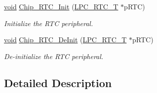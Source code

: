\begin{DoxyCompactItemize}
\hyperlink{Paradigm_2Tern__EE_2small_2portmacro_8h_a14d32f8130d3c0b212cfc751730b5b49}{void} \hyperlink{group__RTC__17XX__40XX_gac37fe41fed088f1336797e05674125ff}{Chip\-\_\-\-R\-T\-C\-\_\-\-Init} (\hyperlink{structLPC__RTC__T}{L\-P\-C\-\_\-\-R\-T\-C\-\_\-\-T} $\ast$p\-R\-T\-C)
\begin{DoxyCompactList}\small\item\em Initialize the R\-T\-C peripheral. \end{DoxyCompactList}\item 
\hyperlink{Paradigm_2Tern__EE_2small_2portmacro_8h_a14d32f8130d3c0b212cfc751730b5b49}{void} \hyperlink{group__RTC__17XX__40XX_ga63cc16f1c4b72523e0e67a6c651f0026}{Chip\-\_\-\-R\-T\-C\-\_\-\-De\-Init} (\hyperlink{structLPC__RTC__T}{L\-P\-C\-\_\-\-R\-T\-C\-\_\-\-T} $\ast$p\-R\-T\-C)
\begin{DoxyCompactList}\small\item\em De-\/initialize the R\-T\-C peripheral. \end{DoxyCompactList}\end{DoxyCompactItemize}


\subsection{Detailed Description}


